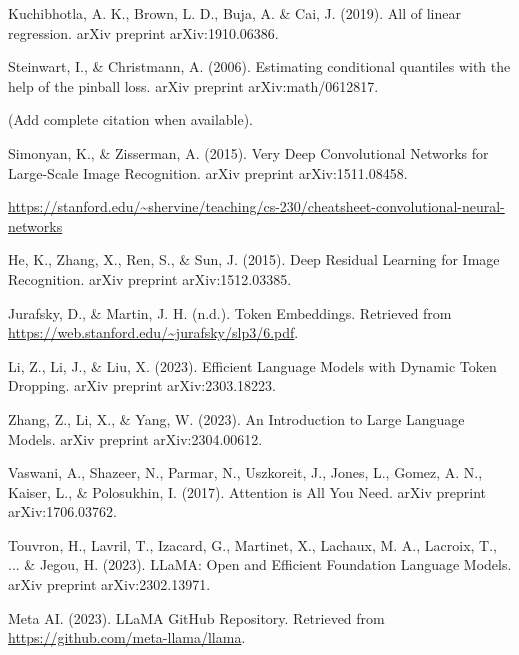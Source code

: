 \begin{thebibliography}{99}
%

	 Kuchibhotla, A. K., Brown, L. D., Buja, A. \& Cai, J. (2019). All of linear regression. arXiv preprint arXiv:1910.06386.

	 Steinwart, I., \& Christmann, A. (2006). Estimating conditional quantiles with the help of the pinball loss. arXiv preprint arXiv:math/0612817.

	 (Add complete citation when available).

	 Simonyan, K., \& Zisserman, A. (2015). Very Deep Convolutional Networks for Large-Scale Image Recognition. arXiv preprint arXiv:1511.08458.

	 \url{https://stanford.edu/~shervine/teaching/cs-230/cheatsheet-convolutional-neural-networks}

	 He, K., Zhang, X., Ren, S., \& Sun, J. (2015). Deep Residual Learning for Image Recognition. arXiv preprint arXiv:1512.03385.

	 Jurafsky, D., \& Martin, J. H. (n.d.). Token Embeddings. Retrieved from \url{https://web.stanford.edu/~jurafsky/slp3/6.pdf}.

	 Li, Z., Li, J., \& Liu, X. (2023). Efficient Language Models with Dynamic Token Dropping. arXiv preprint arXiv:2303.18223.

	 Zhang, Z., Li, X., \& Yang, W. (2023). An Introduction to Large Language Models. arXiv preprint arXiv:2304.00612.

	 Vaswani, A., Shazeer, N., Parmar, N., Uszkoreit, J., Jones, L., Gomez, A. N., Kaiser, L., \& Polosukhin, I. (2017). Attention is All You Need. arXiv preprint arXiv:1706.03762.

	 Touvron, H., Lavril, T., Izacard, G., Martinet, X., Lachaux, M. A., Lacroix, T., ... \& Jegou, H. (2023). LLaMA: Open and Efficient Foundation Language Models. arXiv preprint arXiv:2302.13971.

	 Meta AI. (2023). LLaMA GitHub Repository. Retrieved from \url{https://github.com/meta-llama/llama}.


\end{thebibliography}
